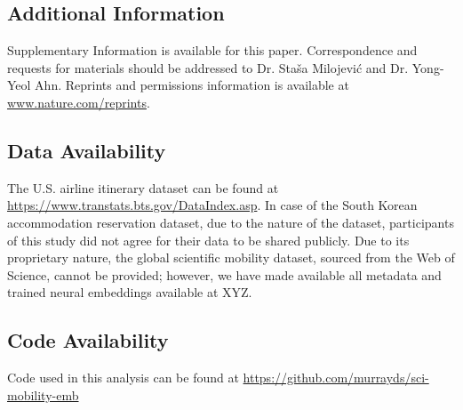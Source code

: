 \documentclass[12pt]{article} %
\begin{document}
%
% 
\subsection*{Additional Information}
Supplementary Information is available for this paper.
Correspondence and requests for materials should be addressed to Dr. Staša Milojević and Dr. Yong-Yeol Ahn.
Reprints and permissions information is available at 
\url{www.nature.com/reprints}.


\subsection*{Data Availability}
The U.S. airline itinerary dataset can be found at \url{https://www.transtats.bts.gov/DataIndex.asp}. 
In case of the South Korean accommodation reservation dataset, due to the nature of the dataset, participants of this study did not agree for their data to be shared publicly.
Due to its proprietary nature, the global scientific mobility dataset, sourced from the Web of Science, cannot be provided;
however, we have made available all metadata and trained neural embeddings available at XYZ. 

\subsection*{Code Availability}
Code used in this analysis can be found at \url{https://github.com/murrayds/sci-mobility-emb}


\printbibliography{}
\end{document}
